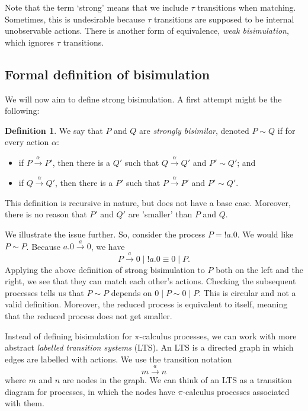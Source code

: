 \documentclass[a4paper, openany]{memoir}
\theoremstyle{definition}
\newtheorem{definition}[proposition]{Definition}
\begin{document}
    Note that the term `strong' means that we include $\tau$ transitions when matching. Sometimes, this is undesirable because $\tau$ transitions are supposed to be internal unobservable actions. There is another form of equivalence, \emph{weak bisimulation}, which ignores $\tau$ transitions.

    \subsection{Formal definition of bisimulation}
    We will now aim to define strong bisimulation. A first attempt might be the following:
    \begin{definition}
        We say that $P$ and $Q$ are \emph{strongly bisimilar}, denoted $P \sim Q$ if for every action $\alpha$:
        \begin{itemize}
            \item if $P \xrightarrow{\alpha} P'$, then there is a $Q'$ such that $Q \xrightarrow{\alpha} Q'$ and $P' \sim Q'$; and
            \item if $Q \xrightarrow{\alpha} Q'$, then there is a $P'$ such that $P \xrightarrow{\alpha} P'$ and $P' \sim Q'$.
        \end{itemize}
    \end{definition}
    This definition is recursive in nature, but does not have a base case. Moreover, there is no reason that $P'$ and $Q'$ are 'smaller' than $P$ and $Q$.

    We illustrate the issue further. So, consider the process $P = !a.0$. We would like $P \sim P$. Because $a.0 \xrightarrow{a} 0$, we have
    \[P \xrightarrow{a} 0 \mid !a.0 \equiv 0 \mid P.\]
    Applying the above definition of strong bisimulation to $P$ both on the left and the right, we see that they can match each other's actions. Checking the subsequent processes tells us that $P \sim P$ depends on $0 \mid P \sim 0 \mid P$. This is circular and not a valid definition. Moreover, the reduced process is equivalent to itself, meaning that the reduced process does not get smaller.

    Instead of defining bisimulation for $\pi$-calculus processes, we can work with more abstract \emph{labelled transition systems} (LTS). An LTS is a directed graph in which edges are labelled with actions. We use the transition notation
    \[m \xrightarrow{a} n\]
    where $m$ and $n$ are nodes in the graph. We can think of an LTS as a transition diagram for processes, in which the nodes have $\pi$-calculus processes associated with them.
\end{document}
